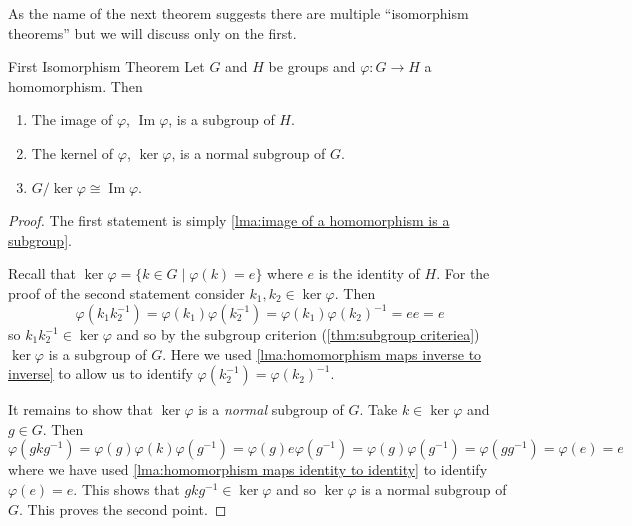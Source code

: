\documentclass[fleqn]{NotesClass}
\newcommand*{\isomorphic}{\cong}
\DeclareMathOperator{\image}{Im}
\begin{document}
    As the name of the next theorem suggests there are multiple \enquote{isomorphism theorems} but we will discuss only on the first.
    \begin{thm}{First Isomorphism Theorem}{}
        Let \(G\) and \(H\) be groups and \(\varphi \colon G \to H\) a homomorphism.
        Then
        \begin{enumerate}
            \item The image of \(\varphi\), \(\image\varphi\), is a subgroup of \(H\).
            \item The kernel of \(\varphi\), \(\ker\varphi\), is a normal subgroup of \(G\).
            \item \(G/\ker \varphi \isomorphic \image \varphi\).
        \end{enumerate}
        \begin{proof}
            The first statement is simply \cref{lma:image of a homomorphism is a subgroup}.
            
            Recall that \(\ker\varphi = \{k \in G \mid \varphi(k) = e\}\) where \(e\) is the identity of \(H\).
            For the proof of the second statement consider \(k_1, k_2 \in \ker\varphi\).
            Then
            \begin{equation}
                \varphi(k_1k_2^{-1}) = \varphi(k_1)\varphi(k_2^{-1}) = \varphi(k_1)\varphi(k_2)^{-1} = ee = e
            \end{equation}
            so \(k_1k_2^{-1} \in \ker\varphi\) and so by the subgroup criterion (\cref{thm:subgroup criteriea}) \(\ker\varphi\) is a subgroup of \(G\).
            Here we used \cref{lma:homomorphism maps inverse to inverse} to allow us to identify \(\varphi(k_2^{-1}) = \varphi(k_2)^{-1}\).
            
            It remains to show that \(\ker\varphi\) is a \emph{normal} subgroup of \(G\).
            Take \(k \in \ker\varphi\) and \(g \in G\).
            Then
            \begin{equation}
                \varphi(gkg^{-1}) = \varphi(g)\varphi(k)\varphi(g^{-1}) = \varphi(g)e\varphi(g^{-1}) = \varphi(g)\varphi(g^{-1}) = \varphi(gg^{-1}) = \varphi(e) =e
            \end{equation}
            where we have used \cref{lma:homomorphism maps identity to identity} to identify \(\varphi(e) = e\).
            This shows that \(gkg^{-1} \in \ker\varphi\) and so \(\ker\varphi\) is a normal subgroup of \(G\).
            This proves the second point.
            

\end{proof}
\end{thm}
\end{document}
